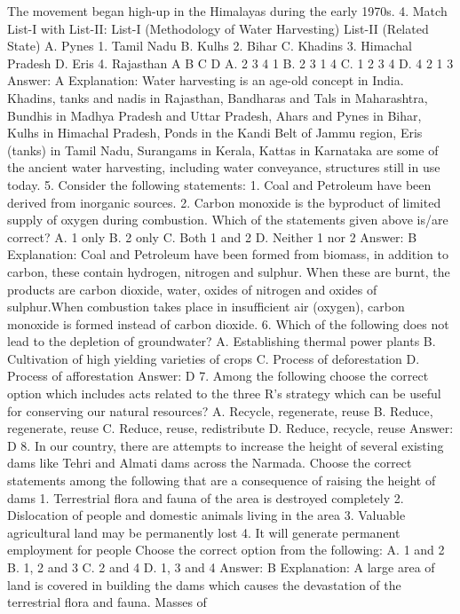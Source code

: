 The movement began high-up in the Himalayas during the early 1970s.
4. Match List-I with List-II:
List-I (Methodology of
Water Harvesting) List-II (Related State)
A. Pynes 1. Tamil Nadu
B. Kulhs 2. Bihar
C. Khadins 3. Himachal Pradesh
D. Eris 4. Rajasthan
A B C D
A. 2 3 4 1
B. 2 3 1 4
C. 1 2 3 4
D. 4 2 1 3
Answer: A
Explanation:
Water harvesting is an age-old concept in India.
Khadins, tanks and nadis in Rajasthan,
Bandharas and Tals in Maharashtra,
Bundhis in Madhya Pradesh and Uttar Pradesh,
Ahars and Pynes in Bihar,
Kulhs in Himachal Pradesh,
Ponds in the Kandi Belt of Jammu region,
Eris (tanks) in Tamil Nadu,
Surangams in Kerala,
Kattas in Karnataka
are some of the ancient water harvesting, including water conveyance,
structures still in use today.
5. Consider the following statements:
1. Coal and Petroleum have been derived from inorganic sources.
2. Carbon monoxide is the byproduct of limited supply of oxygen during
combustion.
Which of the statements given above is/are correct?
A. 1 only
B. 2 only
C. Both 1 and 2
D. Neither 1 nor 2
Answer: B
Explanation: Coal and Petroleum have been formed from biomass, in
addition to carbon, these contain hydrogen, nitrogen and sulphur.
When these are burnt, the products are carbon dioxide, water, oxides
of nitrogen and oxides of sulphur.When combustion takes place in
insufficient air (oxygen), carbon monoxide is formed instead of carbon
dioxide.
6. Which of the following does not lead to the depletion of
groundwater?
A. Establishing thermal power plants
B. Cultivation of high yielding varieties of crops
C. Process of deforestation
D. Process of afforestation
Answer: D
7. Among the following choose the correct option which includes
acts related to the three R's strategy which can be useful for
conserving our natural resources?
A. Recycle, regenerate, reuse
B. Reduce, regenerate, reuse
C. Reduce, reuse, redistribute
D. Reduce, recycle, reuse
Answer: D
8. In our country, there are attempts to increase the height of
several existing dams like Tehri and Almati dams across the
Narmada. Choose the correct statements among the following that
are a consequence of raising the height of dams
1. Terrestrial flora and fauna of the area is destroyed completely
2. Dislocation of people and domestic animals living in the area
3. Valuable agricultural land may be permanently lost
4. It will generate permanent employment for people
Choose the correct option from the following:
A. 1 and 2
B. 1, 2 and 3
C. 2 and 4
D. 1, 3 and 4
Answer: B
Explanation: A large area of land is covered in building the dams which
causes the devastation of the terrestrial flora and fauna. Masses of
